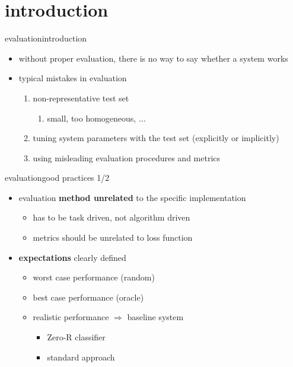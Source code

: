     \section[intro]{introduction}
        \begin{frame}{evaluation}{introduction}
           \begin{itemize}
                \item   without proper evaluation, there is no way to say whether a system works
                \bigskip
                \item   typical mistakes in evaluation
                \begin{enumerate}
                    \item   non-representative test set
                        \begin{enumerate}
                            \item	small, too homogeneous, ...
                        \end{enumerate}
                    \item   tuning system parameters with the test set (explicitly or implicitly)
                    \item   using misleading evaluation procedures and metrics
                \end{enumerate}
            \end{itemize}
        \end{frame}
        \begin{frame}{evaluation}{good practices 1/2}
           \begin{itemize}
                \item   evaluation \textbf{method unrelated} to the specific implementation
                    \begin{itemize}
                        \item   has to be task driven, not algorithm driven
                        \item   metrics should be unrelated to loss function
                    \end{itemize}
                \bigskip
                \item<2->   \textbf{expectations} clearly defined
                    \begin{itemize}
                        \item   worst case performance (random)
                        \item   best case performance (oracle)
                        \item   realistic performance $\Rightarrow$ baseline system
                            \begin{itemize}
                                \item   Zero-R classifier
                                \item   standard approach
                            \end{itemize}
                    \end{itemize}
            \end{itemize}
        \end{frame}
